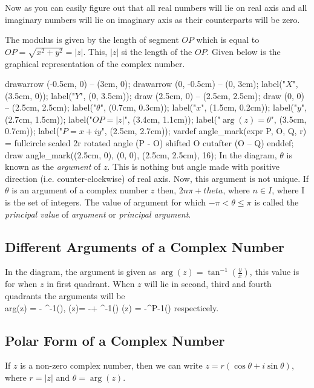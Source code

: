 Now as you can easily figure out that all real numbers will lie on real axis and all imaginary numbers will lie on imaginary axis
as their counterparts will be zero.

The modulus is given by the length of segment $OP$ which is equal to $OP=\sqrt{x^2+y^2}=|z|$. This, $|z|$ si the length of the
$OP$. Given below is the graphical representation of the complex number.

\startplacefigure[title=Complex number in argand plane or complex plane.]
  \startMPcode
    drawarrow (-0.5cm, 0) -- (3cm, 0);
    drawarrow (0, -0.5cm) -- (0, 3cm);
    label("$X$", (3.5cm, 0));
    label("$Y$", (0, 3.5cm));
    draw (2.5cm, 0) -- (2.5cm, 2.5cm);
    draw (0, 0) -- (2.5cm, 2.5cm);
    label("$\theta$", (0.7cm, 0.3cm));
    label("$x$", (1.5cm, 0.2cm));
    label("$y$", (2.7cm, 1.5cm));
    label("$OP=|z|$", (3.4cm, 1.1cm));
    label("$\arg(z)=\theta$", (3.5cm, 0.7cm));
    label("$P = x + iy$", (2.5cm, 2.7cm));
    vardef angle_mark(expr P, O, Q, r) =
      fullcircle scaled 2r rotated angle (P - O)
      shifted O cutafter (O -- Q)
    enddef;
    draw angle_mark((2.5cm, 0), (0, 0), (2.5cm, 2.5cm), 16);
  \stopMPcode
\stopplacefigure
In the diagram, $\theta$ is known as the {\it argument} of $z$. This is nothing but angle made with positive direction
(i.e. counter-clockwise) of real axis. Now, this argument is not unique. If $\theta$ is an argument of a complex number $z$ then,
$2n\pi + theta$, where $n\in I$, where I is the set of integers. The value of argument for which $-\pi<\theta\leq \pi$ is called
the {\it principal value} of {\it argument} or {\it principal argument}.

\subsection{Different Arguments of a Complex Number}
In the diagram, the argument is given as $\arg(z) = \tan^{-1}\left(\frac{y}{x}\right)$, this value is for when $z$ in first
quadrant. When $z$ will lie in second, third and fourth quadrants the arguments will be
\startformula \\arg(z) = \pi - \tan^{-1}\left(\right), \arg(z)= -\pi + \tan^{-1}\left(\right)\;\; \arg(z) =
-\tan^P{-1}\left(\right)\stopformula
respecticely.

\subsection{Polar Form of a Complex Number}
If $z$ is a non-zero complex number, then we can write $z = r(\cos\theta + i\sin\theta)$, where $r = |z|$ and $\theta = \arg(z)$.

